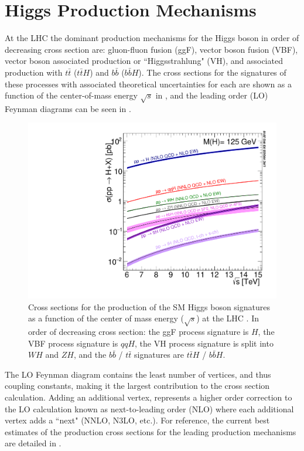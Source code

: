 \section{Higgs Production Mechanisms} \label{sec:higgs:production}

At the LHC the dominant production mechanisms for the Higgs boson in order of
decreasing cross section are: gluon-fluon fusion (ggF), vector boson fusion
(VBF), vector boson associated production or ``Higgsstrahlung" (VH), and
associated production with $t\bar{t}$ ($t\bar{t}H$) and $b\bar{b}$
($b\bar{b}H$).  The cross sections for the signatures of these processes with
associated theoretical uncertainties for each are shown as a function of the
center-of-mass energy $\sqrt{s}$ in , and the
leading order (LO) Feynman diagrams can be seen in .

\begin{figure}[!htbp]
  \begin{center}
    \includegraphics[width=0.5\linewidth]{figures/higgs/higgs_xsection.pdf}
    \caption{Cross sections for the production of the SM Higgs boson signatures
as a function of the center of mass energy ($\sqrt{s}$) at the LHC
\cite{PDG2018:Ch11}.  In order of decreasing cross section: the ggF process
signature is $H$, the VBF process signature is $qqH$, the VH process signature
is split into $WH$ and $ZH$, and the $b\bar{b}$ / $t\bar{t}$ signatures are
$t\bar{t}H$ / $b\bar{b}H$.}
    \label{fig:higgs_xsection}
  \end{center}
\end{figure}

The LO Feynman diagram contains the least number of vertices, and thus coupling
constants, making it the largest contribution to the cross section calculation.
Adding an additional vertex, represents a higher order correction to the LO
calculation known as next-to-leading order (NLO) where each additional vertex
adds a ``next" (NNLO, N3LO, etc.). For reference, the current best
estimates of the production cross sections for the leading production
mechanisms are detailed in .

